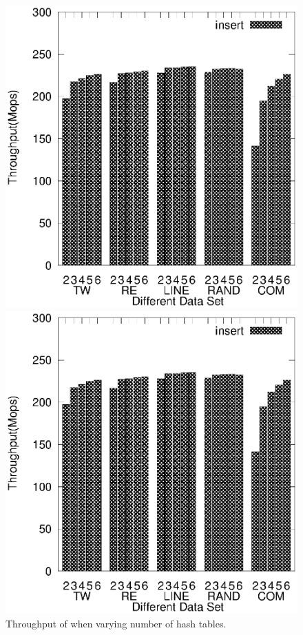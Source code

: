 \begin{figure}[h]
\begin{minipage}{0.45\linewidth}\centering
	\includegraphics[width=\linewidth]{pic/tunning/tunning-insert.eps}
	\centerline{}
	\end{minipage}
	\hfill
	\begin{minipage}{0.45\linewidth}\centering
	\includegraphics[width=\linewidth]{pic/tunning/tunning-insert.eps}
	\centerline{}
	\end{minipage}
	\caption{Throughput of \voter when varying number of hash tables.}
	\label{fig:vary-table}
\end{figure}

